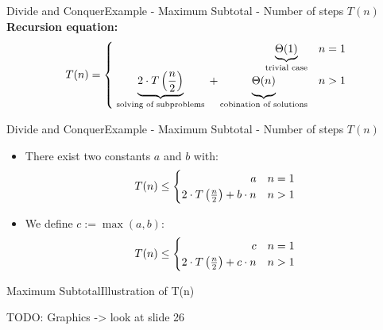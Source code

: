 

\begin{frame}{Divide and Conquer}{Example - Maximum Subtotal
    - Number of steps $T(n)$}
  \textbf{Recursion equation:}
  \begin{displaymath}
    T(n) = \begin{cases}
      \hfill \underbrace{\Theta(1)}_\text{trivial case} & n = 1\\
      \underbrace{2 \cdot T\left(\frac{n}{2}\right)}_\text{
        solving of subproblems
      } + \underbrace{
        \Theta(n)
        \vphantom{\left(\frac{n}{2}\right)}
      }_\text{cobination of solutions} & n > 1
    \end{cases}
  \end{displaymath}
\end{frame}


\begin{frame}{Divide and Conquer}{Example - Maximum Subtotal
    - Number of steps $T(n)$}
  \begin{itemize}
    \item
      There exist two constants $a$ and $b$ with:
      \begin{displaymath}
        T(n) \leq \begin{cases}
          \hfill a & n = 1\\
          2 \cdot T\left(\frac{n}{2}\right) + b \cdot n & n > 1
        \end{cases}
      \end{displaymath}
    \item
      We define $c := \max(a,b)$:
      \begin{displaymath}
        T(n) \leq \begin{cases}
          \hfill c & n = 1\\
          2 \cdot T\left(\frac{n}{2}\right) + c \cdot n & n > 1
        \end{cases}
      \end{displaymath}
  \end{itemize}
\end{frame}


\begin{frame}{Maximum Subtotal}{Illustration of T(n)}
  
  TODO: Graphics -> look at slide 26 \vspace{2em}
  
\end{frame}

